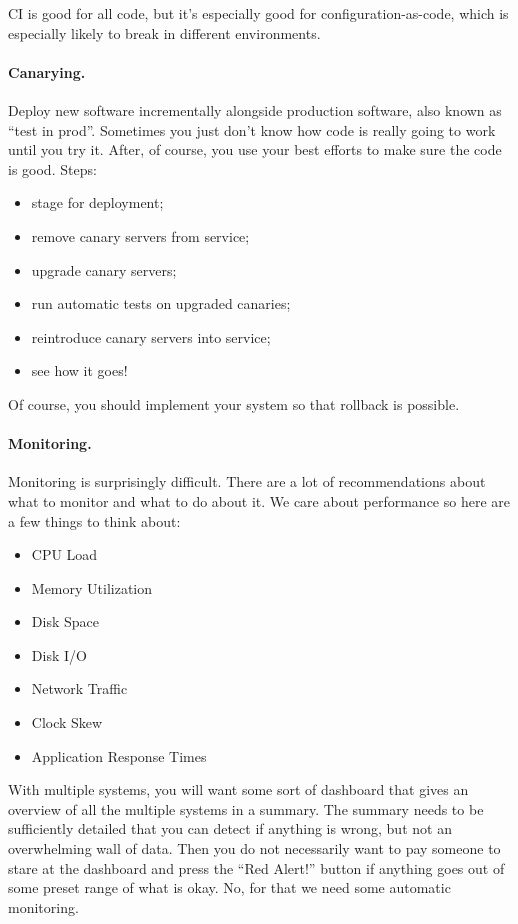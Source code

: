 \documentclass[a4paper]{report}
\begin{document}

CI is good for all code, but it's especially good for configuration-as-code, which is especially likely
to break in different environments.

\paragraph{Canarying.}
Deploy new software incrementally alongside production software, also known as ``test in prod''. Sometimes
you just don't know how code is really going to work until you try it. After, of course, you use your best
efforts to make sure the code is good. Steps:
\begin{itemize}
\item stage for deployment;
\item remove canary servers from service;
\item upgrade canary servers;
\item run automatic tests on upgraded canaries;
\item reintroduce canary servers into service;
\item see how it goes!
\end{itemize}
Of course, you should implement your system so that rollback is possible.

\paragraph{Monitoring.}

Monitoring is surprisingly difficult. There are a lot of recommendations about what to monitor and what to do about it. We care about performance so here are a few things to think about:

\begin{itemize}
	\item CPU Load
	\item Memory Utilization
	\item Disk Space
	\item Disk I/O
	\item Network Traffic
	\item Clock Skew
	\item Application Response Times
\end{itemize}

With multiple systems, you will want some sort of dashboard that gives an overview of all the multiple systems in a summary. The summary needs to be sufficiently detailed that you can detect if anything is wrong, but not an overwhelming wall of data. Then you do not necessarily want to pay someone to stare at the dashboard and press the  ``Red Alert!'' button if anything goes out of some preset range of what is okay. No, for that we need some automatic monitoring.
\end{document}
